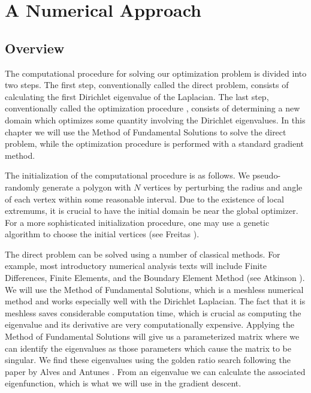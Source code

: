 
\chapter{A Numerical Approach}
\thispagestyle{myheadings}

\section{Overview}

The computational procedure for solving our optimization problem is divided into two steps.
The first step, conventionally called the direct problem, consists of calculating the first Dirichlet eigenvalue of the Laplacian.
The last step, conventionally called the optimization procedure , consists of determining a new domain which optimizes some quantity involving the Dirichlet eigenvalues.
In this chapter we will use the Method of Fundamental Solutions to solve the direct problem\cite{bogomolny}, while the optimization procedure is performed with a standard gradient method\cite{snyman}\cite{wright}.

The initialization of the computational procedure is as follows. 
We pseudo-randomly generate a polygon with $N$ vertices by perturbing the radius and angle of each vertex within some reasonable interval.
Due to the existence of local extremums, it is crucial to have the initial domain be near the global optimizer.
For a more sophisticated initialization procedure, one may use a genetic algorithm to choose the initial vertices (see Freitas \cite{freitas}).

The direct problem can be solved using a number of classical methods.
For example, most introductory numerical analysis texts will include Finite Differences, Finite Elements, and the Boundary Element Method (see Atkinson \cite{atkinson}).
We will use the Method of Fundamental Solutions, which is a meshless numerical method and works especially well with the Dirichlet Laplacian.
The fact that it is meshless saves considerable computation time, which is crucial as computing the eigenvalue and its derivative are very computationally expensive.
Applying the Method of Fundamental Solutions will give us a parameterized matrix where we can identify the eigenvalues as those parameters which cause the matrix to be singular.
We find these eigenvalues using the golden ratio search following the paper by Alves and Antunes \cite{fund}.
From an eigenvalue we can calculate the associated eigenfunction, which is what we will use in the gradient descent.


